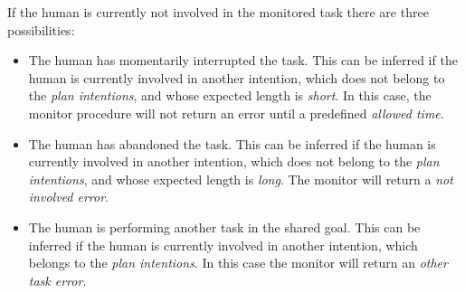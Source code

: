 If the human is currently not involved in the monitored task there are three possibilities:
\begin{itemize}
	\item The human has momentarily interrupted the task. This can be inferred if the human is currently involved in another intention, which does not belong to the \textit{plan intentions}, and whose expected length is \textit{short}. In this case, the monitor procedure will not return an error until a predefined \textit{allowed time}.
	\item The human has abandoned the task.  This can be inferred if the human is currently involved in another intention, which does not belong to the \textit{plan intentions}, and whose expected length is \textit{long}. The monitor will return a \textit{not involved error}. 
	\item The human is performing another task in the shared goal. This can be inferred if the human is currently involved in another intention, which belongs to the \textit{plan intentions}. In this case the monitor will return an \textit{other task error}. 
\end{itemize}